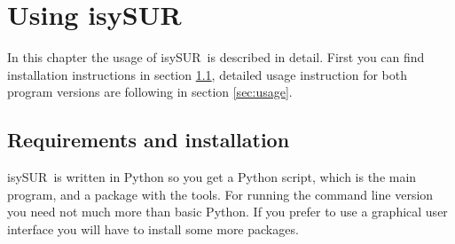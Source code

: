 \documentclass[11pt,fleqn]{book} %
\newcommand{\ProjectTitle}{isySUR}
\newcommand{\pt}{\ProjectTitle}
\begin{document}
\chapter{Using \ProjectTitle}
In this chapter the usage of \pt\ is described in detail. First you can find installation instructions in section \ref{sec:installation}, detailed usage instruction for both program versions are following in section \ref{sec:usage}.

\section{Requirements and installation}\label{sec:installation}
\pt\ is written in Python so you get a Python script, which is the main program, and a package with the tools. For running the command line version you need not much more than basic Python. If you prefer to use a graphical user interface you will have to install some more packages.
\end{document}

